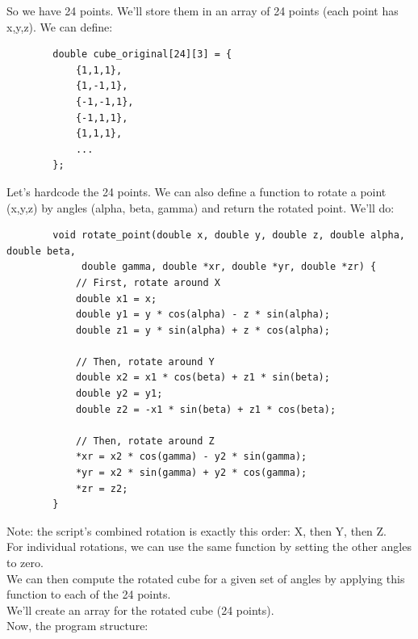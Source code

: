 \documentclass[a4paper,10pt]{article}
\begin{document}
So we have 24 points. We'll store them in an array of 24 points (each point has x,y,z).
We can define:
\begin{verbatim}
        double cube_original[24][3] = {
            {1,1,1},
            {1,-1,1},
            {-1,-1,1},
            {-1,1,1},
            {1,1,1},
            ...
        };
\end{verbatim}
Let's hardcode the 24 points. We can also define a function to rotate a point (x,y,z) by angles (alpha, beta, gamma) and return the rotated point. We'll do:
\begin{verbatim}
        void rotate_point(double x, double y, double z, double alpha, double beta,
             double gamma, double *xr, double *yr, double *zr) {
            // First, rotate around X
            double x1 = x;
            double y1 = y * cos(alpha) - z * sin(alpha);
            double z1 = y * sin(alpha) + z * cos(alpha);

            // Then, rotate around Y
            double x2 = x1 * cos(beta) + z1 * sin(beta);
            double y2 = y1;
            double z2 = -x1 * sin(beta) + z1 * cos(beta);

            // Then, rotate around Z
            *xr = x2 * cos(gamma) - y2 * sin(gamma);
            *yr = x2 * sin(gamma) + y2 * cos(gamma);
            *zr = z2;
        }
\end{verbatim}
Note: the script's combined rotation is exactly this order: X, then Y, then Z.\\
For individual rotations, we can use the same function by setting the other angles to zero.\\
We can then compute the rotated cube for a given set of angles by applying this function to each of the 24 points.\\
We'll create an array for the rotated cube (24 points).\\
Now, the program structure:\\
\end{document}
